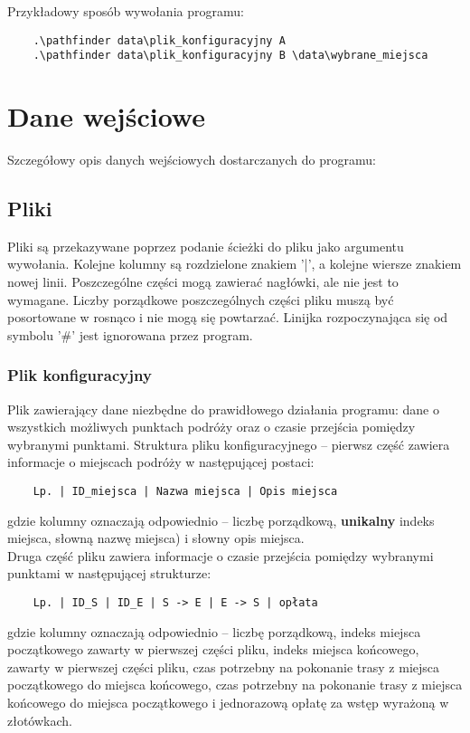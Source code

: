 \documentclass{article}
\begin{document}
\vspace{10pt}
Przykładowy sposób wywołania programu:
\vspace{-8pt}
\begin{verbatim}
    .\pathfinder data\plik_konfiguracyjny A
    .\pathfinder data\plik_konfiguracyjny B \data\wybrane_miejsca
\end{verbatim}


\section{Dane wejściowe}
Szczegółowy opis danych wejściowych dostarczanych do programu:

\subsection{Pliki}
Pliki są przekazywane poprzez podanie ścieżki do pliku jako argumentu wywołania. Kolejne kolumny są rozdzielone znakiem '|', a kolejne wiersze znakiem nowej linii. Poszczególne części mogą zawierać nagłówki, ale nie jest to wymagane. Liczby porządkowe poszczególnych części pliku muszą być posortowane w rosnąco i nie mogą się powtarzać. Linijka rozpoczynająca się od symbolu '\#' jest ignorowana przez program.

\subsubsection{Plik konfiguracyjny}
Plik zawierający dane niezbędne do prawidłowego działania programu: dane o wszystkich możliwych punktach podróży oraz o czasie przejścia pomiędzy wybranymi punktami. Struktura pliku konfiguracyjnego -- pierwsz część zawiera informacje o miejscach podróży w następującej postaci:

\vspace{5pt}
\begin{verbatim}
    Lp. | ID_miejsca | Nazwa miejsca | Opis miejsca
\end{verbatim}
\vspace{5pt}

\noindent gdzie kolumny oznaczają odpowiednio -- liczbę porządkową, \textbf{unikalny} indeks miejsca, słowną nazwę miejsca) i słowny opis miejsca. \\

Druga część pliku zawiera informacje o czasie przejścia pomiędzy wybranymi punktami w następującej strukturze:

\vspace{5pt}
\begin{verbatim}
    Lp. | ID_S | ID_E | S -> E | E -> S | opłata 
\end{verbatim}
\noindent gdzie kolumny oznaczają odpowiednio -- liczbę porządkową, indeks miejsca początkowego zawarty w pierwszej części pliku, indeks miejsca końcowego, zawarty w pierwszej części pliku, czas potrzebny na pokonanie trasy z miejsca początkowego do miejsca końcowego, czas potrzebny na pokonanie trasy z miejsca końcowego do miejsca początkowego i jednorazową opłatę za wstęp wyrażoną w złotówkach.
\vspace{5pt}
\end{document}
